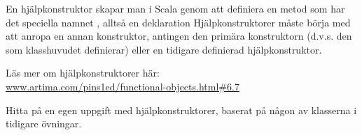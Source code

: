 En hjälpkonstruktor skapar man i Scala genom att definiera en metod som har det speciella namnet , alltså en deklaration  Hjälpkonstruktorer måste börja med att anropa en annan konstruktor, antingen den primära konstruktorn (d.v.s. den som klasshuvudet definierar) eller en tidigare definierad  hjälpkonstruktor.

\Subtask Läs mer om hjälpkonstruktorer här: \\ \href{http://www.artima.com/pins1ed/functional-objects.html#6.7}{www.artima.com/pins1ed/functional-objects.html\#6.7}

\Subtask Hitta på en egen uppgift med hjälpkonstruktorer, baserat på någon av klasserna i tidigare övningar.



\QUESTEND
